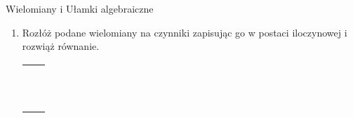 \documentclass[12pt,a4paper]{article}
\begin{document}
	\begin{center}
		\LARGE Wielomiany i Ułamki algebraiczne
	\end{center}
	\vspace{1cm}
	
	
	\begin{enumerate}[1.]
		\item Rozłóż podane wielomiany na czynniki zapisując go w postaci iloczynowej i rozwiąż równanie.
		
		\begin{enumerate}[1)] \begin{tabular}{p{7cm} p{7cm}} 
				\item $4x^2-2x^4+6x^3=0 $& \vspace{0.4cm} \item $9x^2-16=0 $ \\
				\item $6x^3-12x^2+18x=0 $& \item $9x^2-30x+25=0 $ \\
				\item $x^4-10x^2+25 $& \item $7x^3+2x^2-21x-6=0 $ \\
				\item $ x^3+4x^2-2x-8=0$& \item $2x^5+3x^4-2x-3=0 $ \\
				\item $x^6-7x^3-8=0 $& \item $8x^5-32x^3-x^2+4=0 $ \\
				\item $19x^3+9x^2-18x-9=0 $& \item $x^3+4x^2+x-6=0 $ \\
				\item $x^3+7x^2+4x-12=0 $& \item $x^3-x+6=0 $ \\
				\item $x^4+3x^3-15x^2-19x+30=0 $& \item $4x^4-12x^3+25x^2-48x+36=0 $ \\
				\item $x^3+4x^2-2x-8=0 $& \item $x^3-9x^2+23x-15=0 $ \\
				\item $x^3+12x^2+44x+48=0 $& \item $x^3+9x^2+23x+15=0 $ \\
				\item $x^7-17x^6+16x^5=0 $& \item $x^8+x^4-2=0 $ \\

\end{tabular}
\end{enumerate}
\end{enumerate}
\end{document}
